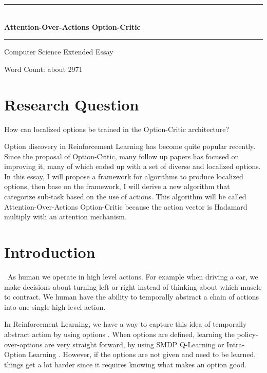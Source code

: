 \documentclass{article}
\date{}
\renewenvironment{abstract}
{\small
	\begin{center}
		\bfseries \abstractname\vspace{-.4em}
	\end{center}
	\list{}{
		\setlength{\leftmargin}{2cm}
		\setlength{\rightmargin}{\leftmargin}
	}
	\item\relax}
{\endlist}
\begin{document}
	\begin{center}
		\large{\rule{420pt}{0.4pt}}\\
		\vspace{0.15in}
		\LARGE{\bfseries{Attention-Over-Actions Option-Critic}}
		\vspace{0.1in}
		\large{\rule{420pt}{0.4pt}}
		
		\large{Computer Science Extended Essay}
		
		\normalsize{Word Count: about 2971}
	\end{center}
	\vspace{0.1in}
	\section*{Research Question}
	How can localized options be trained in the Option-Critic architecture? \\
	\vspace{0.1in}
	\begin{abstract}
	Option discovery in Reinforcement Learning has become quite popular recently. Since the proposal of Option-Critic, many follow up papers has focused on improving it, many of which ended up with a set of diverse and localized options. In this essay, I will propose a framework for algorithms to produce localized options, then base on the framework, I will derive a new algorithm that categorize sub-task based on the use of actions. This algorithm will be called Attention-Over-Actions Option-Critic because the action vector is Hadamard multiply with an attention mechanism.
	\end{abstract}
	\section{Introduction}
	\qquad \ As human we operate in high level actions. For example when driving a car, we make decisions about turning left or right instead of thinking about which muscle to contract. We human have the ability to temporally abstract a chain of actions into one single high level action. 
	
	\quad In Reinforcement Learning, we have a way to capture this idea of temporally abstract action by using options \cite{SUTTON1999181}. When options are defined, learning the policy-over-options are very straight forward, by using SMDP Q-Learning \cite{smdp} or Intra-Option Learning \cite{intraoplearn}. However, if the options are not given and need to be learned, things get a lot harder since it requires knowing what makes an option good. 
\end{document}
